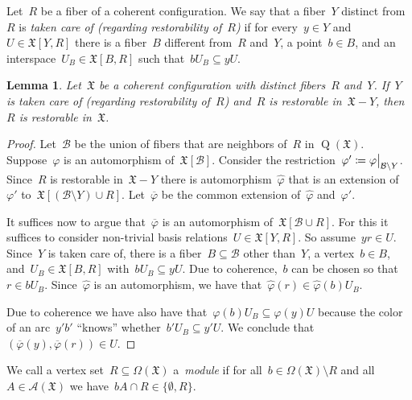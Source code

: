 \documentclass[english,a4paper]{article}
\theoremstyle{plain}
\newtheorem{lemma}      [theorem]{Lemma}
\theoremstyle{definition}
\newcommand{\restr}[2]{
	\ensuremath{
		\left.\kern-\nulldelimiterspace
		#1
		\vphantom{\big|}
		\right|_{#2}
	}
}
\newcommand{\coherentConfig}{\ensuremath{\mathfrak{X}}}
\newcommand{\interspace}[2]{\ensuremath{\coherentConfig[#1,#2]}}
\newcommand{\vertices}{\ensuremath{\Omega}}
\newcommand{\relations}{\ensuremath{\mathcal{A}}}
\newcommand{\arcs}{\ensuremath{A}}
\DeclareMathOperator*{\Quotient}{Q}
\newcommand{\quotientGraph}[1]{\ensuremath{\Quotient(#1)}}
\begin{document}
Let~$R$ be a fiber of a coherent configuration. We say that a fiber~$Y$ distinct from~$R$ is \emph{taken care of (regarding restorability of~$R$)} if for every~$y\in Y$ and~$U\in \interspace{Y}{R}$ there is a fiber~$B$  different from~$R$ and~$Y$, a point~$b\in B$, and an interspace~$U_B\in \interspace{B}{R}$  such that~$bU_B\subseteq yU$.


\begin{lemma}
    \label{critical:restorable:take-care/lem}
    Let~$\coherentConfig$ be a coherent configuration with distinct fibers~$R$ and~$Y$.
    If~$Y$ is taken care of (regarding restorability of~$R$) and~$R$ is restorable in~$\coherentConfig-Y$, then~$R$ is restorable in~$\coherentConfig$.
\end{lemma}
\begin{proof}
    Let~$\mathcal{B}$ be the union of fibers that are neighbors of~$R$ in $\quotientGraph{\coherentConfig}$.
    Suppose~$\varphi$ is an automorphism of~$\coherentConfig[\mathcal{B}]$. Consider the restriction~$\varphi'\coloneqq \restr{\varphi}{\mathcal{B}\setminus{Y}}$. Since~$R$ is restorable in~$\coherentConfig-Y$ there is automorphism~$\widehat{\varphi}$ that is an extension of~$\varphi'$ to~$\coherentConfig[(\mathcal{B} \setminus Y)\cup R]$. Let~$\overline{\varphi}$ be the common extension of~$\widehat{\varphi}$ and~$\varphi'$.

    It suffices now to argue that~$\overline{\varphi}$ is an automorphism of~$\coherentConfig[\mathcal{B}\cup R]$. For this it suffices to consider non-trivial basis relations~$U\in \interspace{Y}{R}$.
    So assume~$yr \in U$.
    Since~$Y$ is taken care of, there is a fiber~$B\subseteq \mathcal{B}$ other than~$Y$, a vertex~$b\in B$, and~$U_B\in \interspace{B}{R}$ with~$bU_B\subseteq yU$. Due to coherence,~$b$ can be chosen so that~$r\in bU_B$.
    Since~$\widehat{\varphi}$ is an automorphism, we
    have that~$\widehat{\varphi}(r)\in \widehat{\varphi}(b) U_B$.

    Due to coherence we have also have
    that~$\varphi(b)U_B\subseteq \varphi(y)U$ because the color of an arc~$y'b'$ ``knows'' whether~$b'U_B\subseteq y'U$.
    We conclude that~$(\overline{\varphi}(y),\overline{\varphi}(r))\in U$.
\end{proof}


We call a vertex set~$R \subseteq \vertices(\coherentConfig)$ a~\emph{module} if for all~$b \in \vertices(\coherentConfig) \setminus R$ and all~$\arcs \in \relations(\coherentConfig)$ we have~$b\arcs \cap R \in \{\emptyset, R\}$.
\end{document}
